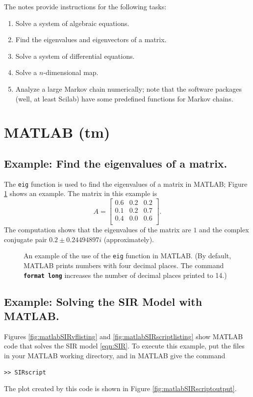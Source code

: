 \documentclass[reqno]{immbook}
\numberwithin{equation}{chapter}
\numberwithin{question}{section}
\numberwithin{theorem}{chapter}
\numberwithin{figure}{chapter}
\theoremstyle{definition}
\begin{document}
The notes provide instructions for the following tasks:
\begin{enumerate}
\item Solve a system of algebraic equations.
\item Find the eigenvalues and eigenvectors of a matrix.
\item Solve a system of differential equations.
\item Solve a $n$-dimensional map.
\item Analyze a large Markov chain numerically; note that
the software packages (well, at least Scilab) have
some predefined functions for Markov chains.
\end{enumerate}
\section{MATLAB (tm)}

\subsection*{Example: Find the eigenvalues of a matrix.}
The \texttt{eig} function is used to find the eigenvalues
of a matrix in MATLAB;
Figure \ref{fig:matlabeigenvaluesoutput} shows an example.
The matrix in this example is
\[
   A = \begin{bmatrix}
          0.6 & 0.2 & 0.2 \\
	  0.1 & 0.2 & 0.7 \\
	  0.4 & 0.0 & 0.6 \\
       \end{bmatrix} .
\]
The computation shows that the eigenvalues of the 
matrix are $1$ and the complex conjugate pair
$0.2 \pm  0.24494897i$
(approximately).

\begin{figure}
\fbox{%

}
\caption{An example of the use of
the \texttt{eig} function in MATLAB.
(By default, MATLAB prints numbers with four
decimal places.  The command \texttt{\textbf{format long}}
increases the number of decimal places
printed to 14.)}
\label{fig:matlabeigenvaluesoutput}
\end{figure}

\subsection*{Example: Solving the SIR Model with MATLAB.}
Figures \ref{fig:matlabSIRvflisting} and
\ref{fig:matlabSIRscriptlisting} show MATLAB code that solves
the SIR model \eqref{eqn:SIR}.
To execute this example, put the files in your MATLAB working
directory, and in MATLAB give the command
\begin{verbatim}
>> SIRscript
\end{verbatim}
The plot created by this code is shown
in Figure \ref{fig:matlabSIRscriptoutput}.
\end{document}
